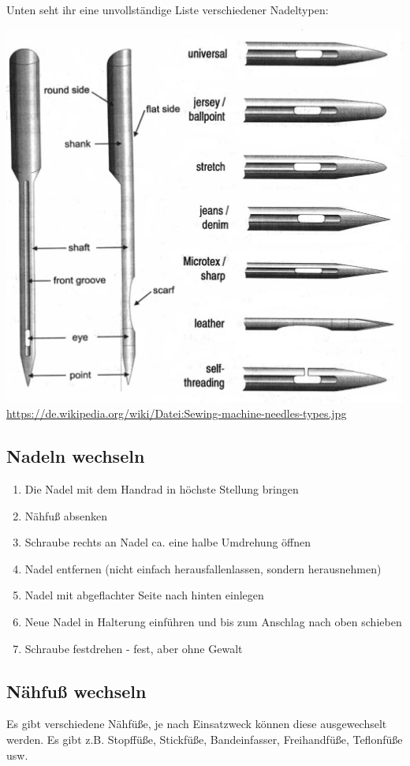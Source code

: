 \documentclass{\basedir/fablab-document}
\begin{document}
Unten seht ihr eine unvollständige Liste verschiedener Nadeltypen:
\begin{center}
	\includegraphics[width=\linewidth/2]{Sewing-machine-needles-types.jpg}
	\url{https://de.wikipedia.org/wiki/Datei:Sewing-machine-needles-types.jpg}
\end{center}

\subsection{Nadeln wechseln}
\begin{enumerate}
	\item Die Nadel mit dem Handrad in höchste Stellung bringen
	\item Nähfuß absenken
	\item Schraube rechts an Nadel ca. eine halbe Umdrehung öffnen
	\item Nadel entfernen (nicht einfach herausfallenlassen, sondern herausnehmen)
	\item Nadel mit abgeflachter Seite nach hinten einlegen
	\item Neue Nadel in Halterung einführen und bis zum Anschlag nach oben schieben
	\item Schraube festdrehen - fest, aber ohne Gewalt
\end{enumerate}

\subsection{Nähfuß wechseln}
Es gibt verschiedene Nähfüße, je nach Einsatzweck können diese ausgewechselt werden. Es gibt z.B. Stopffüße, Stickfüße, Bandeinfasser, Freihandfüße, Teflonfüße usw. 
\end{document}
